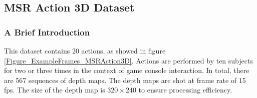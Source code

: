 \documentclass[final,3p,times,twocolumn]{elsarticle}
\begin{document}
\subsection{MSR Action 3D Dataset}

\subsubsection{A Brief Introduction}
This dataset \cite{li2010action} contains 20 actions, as showed in figure \ref{Figure_ExampleFrames_MSRAction3D}. Actions are performed by ten subjects for two or three times in the context of game console interaction. In total, there are 567 sequences of depth maps. The depth maps are shot at frame rate of 15 fps. The size of the depth map is $320 \times 240$ to ensure processing efficiency.

\begin{table}[h]
	\begin{center}
	\end{center}
	\caption{\label{lbl:3ActionSubsets}The three action subsets used in the experiments}
\end{table}
\end{document}
